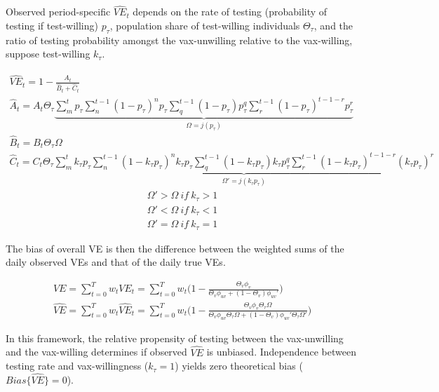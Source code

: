 \documentclass[12pt]{article}
\begin{document}
Observed period-specific $\widehat{VE}_{t}$ depends on the rate of testing (probability of testing if test-willing) $p_\tau$, population share of test-willing individuals $\Theta_{\tau}$, and the ratio of testing probability amongst the vax-unwilling relative to the vax-willing, suppose test-willing $k_\tau$.

\begin{eqnarray}
	\widehat{VE}_{t} = 1 - \frac{\widehat{A}_t}{\widehat{B}_t+\widehat{C}_t} \\
	\widehat{A}_t = A_t \Theta_{\tau} \underbrace{\sum_{m}^{t} p_{\tau} \sum_{n}^{t-1} (1-p_{\tau})^{n}p_{\tau} \sum_{q}^{t-1} (1-p_{\tau})p_{\tau}^{q} \sum_{r}^{t-1} (1-p_{\tau})^{t-1-r} p_{\tau}^{r}}_{\Omega = j(p_\tau)}  \\
	\widehat{B}_t = B_t \Theta_{\tau} \Omega \\
	\widehat{C}_t = C_t \Theta_{\tau} \underbrace{\sum_{m}^{t} k_{\tau} p_{\tau} \sum_{n}^{t-1} (1- k_{\tau} p_{\tau})^{n} k_{\tau} p_{\tau} \sum_{q}^{t-1} (1- k_{\tau} p_{\tau}) k_{\tau} p_{\tau}^{q} \sum_{r}^{t-1} (1- k_{\tau} p_{\tau})^{t-1-r} (k_{\tau} p_{\tau})^{r}}_{\Omega' = j(k_\tau p_\tau)}
\end{eqnarray}
\begin{eqnarray}
	\Omega' > \Omega \ if \ k_\tau > 1 \\
	\Omega' < \Omega \ if \ k_\tau < 1 \\
	\Omega' = \Omega \ if \ k_\tau = 1
\end{eqnarray}

The bias of overall VE is then the difference between the weighted sums of the daily observed VEs and that of the daily true VEs. 

\begin{eqnarray}
	VE = \sum_{t=0}^{T} w_{t} VE_{t} = \sum_{t=0}^{T} w_{t} \Big( 1 - \frac{\Theta_{v}\phi_v}{\Theta_{v} \phi_{uv} + (1 - \Theta_{v}) \phi_{uv}' } \Big) \\
	\widehat{VE} = \sum_{t=0}^{T} w_{t} \widehat{VE}_{t} = \sum_{t=0}^{T} w_{t} \Big( 1 - \frac{\Theta_{v}\phi_v\Theta_{\tau}\Omega }{\Theta_{v} \phi_{uv}\Theta_{\tau}\Omega + (1 - \Theta_{v}) \phi_{uv}'\Theta_{\tau}\Omega' } \Big)
\end{eqnarray}

In this framework, the relative propensity of testing between the vax-unwilling and the vax-willing determines if observed $\widehat{VE}$ is unbiased. Independence between testing rate and vax-willingness ($k_{\tau} = 1$) yields zero theoretical bias (${Bias}\{\hat{VE}\} = 0$). 
\end{document}
